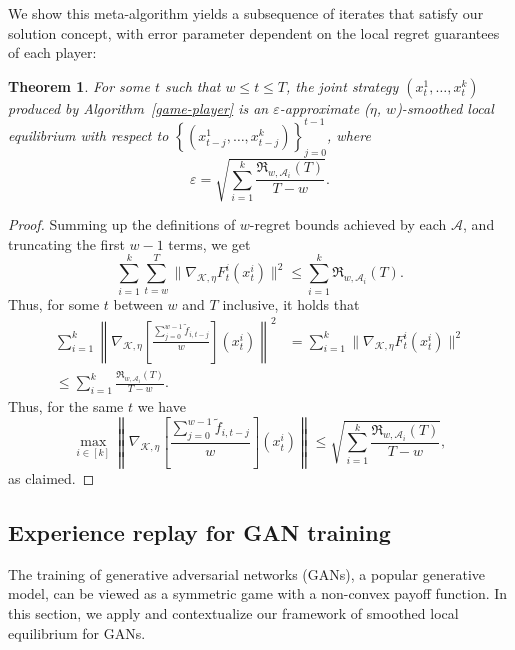 \documentclass{article}
\def\norm#1{\mathopen\| #1 \mathclose\|}
\newcommand{\K}{\ensuremath{\mathcal K}}
\def\eps{\varepsilon}
\newcommand{\braces}[1]{\left\{#1\right\}}
\newcommand{\bra}[1]{\left[#1\right]}
\newtheorem{theorem}{Theorem}[section]
\renewcommand{\K}{\mathcal{K}}
\newcommand{\Acal}{\mathcal{A}}
\newcommand{\regret}{\mathfrak{R}}
\begin{document}
We show this meta-algorithm yields a subsequence of iterates that satisfy our solution concept, with error parameter dependent on the local regret guarantees of each player:
\begin{theorem}
For some $t$ such that $w \leq t \leq T$, the joint strategy $(x_t^1, \ldots, x_t^k)$ produced by Algorithm~\ref{game-player} is an $\eps$-approximate ($\eta$, $w$)-smoothed local equilibrium with respect to $\braces{ (x_{t-j}^1, \ldots, x_{t-j}^k) }_{j=0}^{t-1}$, where
\[\eps = \sqrt{ \sum_{i=1}^k \frac{\regret_{w,\Acal_i}(T)}{T - w} }.\]
\end{theorem}
\begin{proof}
Summing up the definitions of $w$-regret bounds achieved by each $\Acal$, and truncating the first $w-1$ terms, we get
\begin{equation*}
\sum_{i=1}^k \sum_{t=w}^T \norm{ \nabla_{\K, \eta} F_t^i(x_t^i) }^2 \leq \sum_{i=1}^k \regret_{w,\Acal_i}(T).
\end{equation*}
Thus, for some $t$ between $w$ and $T$ inclusive, it holds that
\begin{align*}
\sum_{i=1}^k \left\lVert \nabla_{\K, \eta} \bra{ \frac{ \sum_{j=0}^{w-1} \tilde f_{i,t-j} }{w}}(x_t^i) \right\rVert ^2
&=
\sum_{i=1}^k \norm{ \nabla_{\K, \eta} F_t^i(x_t^i) }^2 \\
\leq
\sum_{i=1}^k \frac{\regret_{w,\Acal_i}(T)}{T - w}.
\end{align*}
Thus, for the same $t$ we have
\begin{equation*}
\max_{i\in [k]} \left\lVert \nabla_{\K, \eta} \bra{ \frac{ \sum_{j=0}^{w-1} \tilde f_{i,t-j} }{w}}(x_t^i) \right\rVert
\leq
\sqrt{\sum_{i=1}^k \frac{\regret_{w,\Acal_i}(T)}{T - w}},
\end{equation*}
as claimed.
\end{proof}

\subsection{Experience replay for GAN training}
The training of generative adversarial networks (GANs), a popular generative model, can be viewed as a symmetric game with a non-convex payoff function. In this section, we apply and contextualize our framework of smoothed local equilibrium for GANs.
\end{document}
